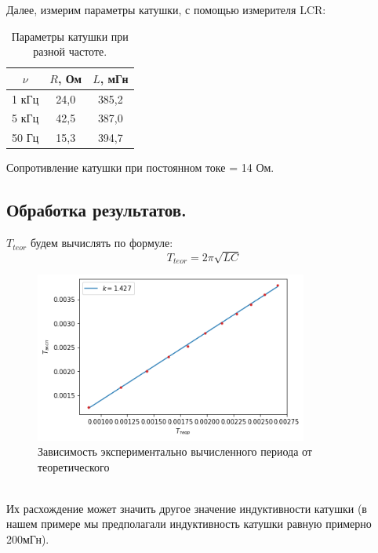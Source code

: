 \documentclass[a4paper, 12pt]{article}%
\begin{document}
\begin{center}
Далее, измерим параметры катушки, с помощью измерителя LCR:

\begin{table}[h!]
\begin{center}
\begin{tabular}{|c|c|c|}
\hline
$\nu$ & $R$, Ом & $L$, мГн   \\ \hline
1 кГц       & 24,0 &  385,2    \\ \hline
5 кГц      & 42,5  &  387,0  \\ \hline
50 Гц      & 15,3    & 394,7 \\ \hline

\end{tabular}
\caption{Параметры катушки при разной частоте.}
\end{center}
\end{table}
Сопротивление катушки при постоянном токе = 14 Ом.

\end{center}
\newpage
\subsection*{Обработка результатов.}
\begin{center}
$T_{teor}$ будем вычислять по формуле:
\begin{equation}
T_{teor} = 2 \pi \sqrt{L C}
\end{equation}
\begin{figure}[h!]
\begin{center}
\includegraphics[width = 0.8\textwidth]{2.png}
\caption{Зависимость экспериментально вычисленного периода от теоретического}
\end{center}
\end{figure}
\\
Их расхождение может значить другое значение индуктивности катушки (в нашем примере мы предполагали индуктивность катушки равную примерно 200мГн). \\
\end{center}
\end{document}
